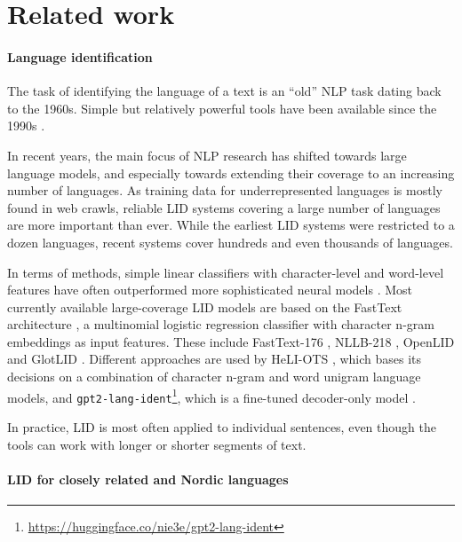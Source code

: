 \section{Related work}
\paragraph{Language identification} The task of identifying the language of a text is an ``old'' NLP task dating back to the 1960s. Simple but relatively powerful tools have been available since the 1990s \citep{jauhiainen-jair2019}.

In recent years, the main focus of NLP research has shifted towards large language models, and especially towards extending their coverage to an increasing number of languages. As training data for underrepresented languages is mostly found in web crawls, reliable LID systems covering a large number of languages are more important than ever. While the earliest LID systems were restricted to a dozen languages, recent systems cover hundreds \citep{joulin-etal-2017-bag,grave-etal-2018-learning,burchell-etal-2023-open,heliots2022} and even thousands \citep{kargaran2023glotlid} of languages.

In terms of methods, simple linear classifiers with character-level and word-level features have often outperformed more sophisticated neural models \citep{jauhiainen-jair2019}. Most currently available large-coverage LID models are based on the FastText architecture \citep{joulin-etal-2017-bag}, a multinomial logistic regression classifier with character n-gram embeddings as input features. These include FastText-176 \citep{joulin-etal-2017-bag,grave-etal-2018-learning}, NLLB-218 \citep{nllbteam2022languageleftbehindscaling}, OpenLID \citep{burchell-etal-2023-open} and GlotLID \citep{kargaran2023glotlid}. Different approaches are used by HeLI-OTS \citep{jauhiainen-etal-2022-heli}, which bases its decisions on a combination of character n-gram and word unigram language models, and \texttt{gpt2-lang-ident}\footnote{\url{https://huggingface.co/nie3e/gpt2-lang-ident}}, which is a fine-tuned decoder-only model \citep{radford2019language}.

In practice, LID is most often applied to individual sentences, even though the tools can work with longer or shorter segments of text.


\paragraph{LID for closely related and Nordic languages}

